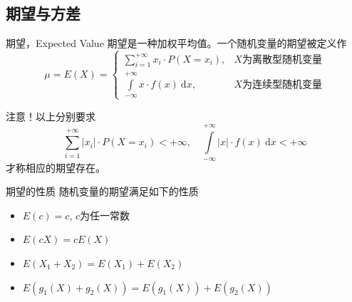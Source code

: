 \subsection{期望与方差}


\begin{frame}

\begin{block}{期望，Expected Value}
期望是一种加权平均值。一个随机变量的期望被定义作
\[\mu = E(X) = \begin{cases}
\sum\limits_{i=1}^{+\infty} x_i\cdot P(X=x_i), & \text{$X$为离散型随机变量} \\
\int\limits_{-\infty}^{+\infty} x\cdot f(x) ~ \mathrm{d}x, & \text{$X$为连续型随机变量}
\end{cases}\]

\vspace{1em}
\pause

{\color{red}注意}！以上分别要求
\[\sum\limits_{i=1}^{+\infty} \vert x_i \vert \cdot P(X=x_i) < +\infty,\quad \int\limits_{-\infty}^{+\infty} \vert x \vert \cdot f(x) ~ \mathrm{d}x < +\infty\]
才称相应的期望存在。
\end{block}

\end{frame}


\begin{frame}

\begin{block}{期望的性质}
随机变量的期望满足如下的性质
\begin{itemize}
\item $E(c) = c$, $c$为任一常数
\item $E(cX) = cE(X)$
\item $E(X_1 + X_2) = E(X_1) + E(X_2)$
\item $E(g_1(X) + g_2(X)) = E(g_1(X)) + E(g_2(X))$
\end{itemize}
\end{block}

\end{frame}


